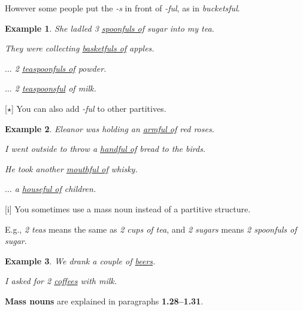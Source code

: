 \documentclass[oneside]{book}
\numberwithin{equation}{section}
\newtheorem{example}{Example}[section]
\begin{document}
However some people put the \textit{-s} in front of \textit{-ful}, as in \textit{bucketsful}.
\begin{example}
    She ladled 3 \underline{spoonfuls of} sugar into my tea.
    
    They were collecting \underline{basketfuls of} apples.
    
    $\ldots$ 2 \underline{teaspoonfuls of} powder.
    
    $\ldots$ 2 \underline{teaspoonsful} of milk.
\end{example}
%
\noindent{} [$\star$] You can also add \textit{-ful} to other partitives.
\begin{example}
    Eleanor was holding an \underline{armful of} red roses.
    
    I went outside to throw a \underline{handful of} bread to the birds.
    
    He took another \underline{mouthful of} whisky.
    
    $\ldots$ a \underline{houseful of} children.
\end{example}
%
\noindent{} [i] You sometimes use a mass noun instead of a partitive structure.

E.g., \textit{2 teas} means the same as \textit{2 cups of tea}, and \textit{2 sugars} means \textit{2 spoonfuls of sugar}.
\begin{example}
    We drank a couple of \underline{beers}.
    
    I asked for 2 \underline{coffees} with milk.
\end{example}
\textbf{Mass nouns} are explained in paragraphs \textbf{1.28--1.31}.
\end{document}
